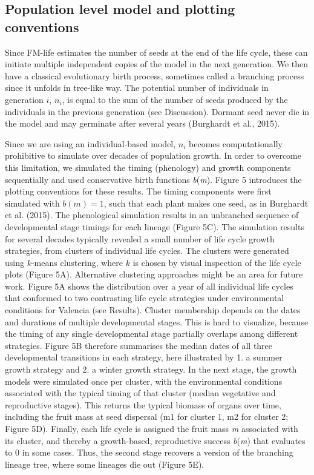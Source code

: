 \documentclass[phd]{infthesis}
\begin{document}
\subsection{Population level model and plotting
  conventions}
\label{population-level-model-and-plotting-conventions}

Since FM-life estimates the number of seeds at the end of the life
cycle, these can initiate multiple independent copies of the model in
the next generation. We then have a classical evolutionary birth
process, sometimes called a branching process since it unfolds in
tree-like way. The potential number of individuals in generation \(i\),
\(n_{i}\), is equal to the sum of the number of seeds produced by the
individuals in the previous generation (see Discussion). Dormant seed
never die in the model and may germinate after several years (Burghardt
et al., 2015).

Since we are using an individual-based model, \(n_{i}\) becomes
computationally prohibitive to simulate over decades of population
growth. In order to overcome this limitation, we simulated the timing
(phenology) and growth components sequentially and used conservative
birth functions \emph{b}(\emph{m}). Figure 5 introduces the plotting
conventions for these results. The timing components were first
simulated with \(b(m) = 1\), such that each plant makes one seed, as in
Burghardt et al. (2015). The phenological simulation results in an
unbranched sequence of developmental stage timings for each lineage
(Figure 5C). The simulation results for several decades typically
revealed a small number of life cycle growth strategies, from clusters
of individual life cycles. The clusters were generated using \(k\)-means
clustering, where \(k\) is chosen by visual inspection of the life cycle
plots (Figure 5A). Alternative clustering approaches might be an area
for future work. Figure 5A shows the distribution over a year of all
individual life cycles that conformed to two contrasting life cycle
strategies under environmental conditions for Valencia (see Results).
Cluster membership depends on the dates and durations of multiple
developmental stages. This is hard to visualize, because the timing of
any single developmental stage partially overlaps among different
strategies. Figure 5B therefore summarises the median dates of all three
developmental transitions in each strategy, here illustrated by 1. a
summer growth strategy and 2. a winter growth strategy. In the next
stage, the growth models were simulated once per cluster, with the
environmental conditions associated with the typical timing of that
cluster (median vegetative and reproductive stages). This returns the
typical biomass of organs over time, including the fruit mass at seed
dispersal (m1 for cluster 1, m2 for cluster 2; Figure 5D). Finally, each
life cycle is assigned the fruit mass \emph{m} associated with its
cluster, and thereby a growth-based, reproductive success
\emph{b}(\emph{m}) that evaluates to 0 in some cases. Thus, the second
stage recovers a version of the branching lineage tree, where some
lineages die out (Figure 5E).
\end{document}
